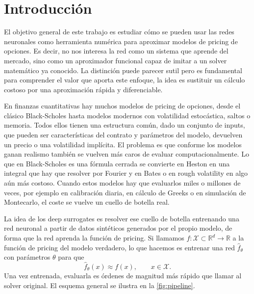 \documentclass[11pt,a4paper]{article}
\begin{document}
\section{Introducción}

El objetivo general de este trabajo es estudiar cómo se pueden usar las redes neuronales como herramienta numérica para aproximar modelos de pricing de opciones. Es decir, no nos interesa la red como un sistema que aprende del mercado, sino como un aproximador funcional capaz de imitar a un solver matemático ya conocido. La distinción puede parecer sutil pero es fundamental para comprender el valor que aporta este enfoque, la idea es sustituir un cálculo costoso por una aproximación rápida y diferenciable.

En finanzas cuantitativas hay muchos modelos de pricing de opciones, desde el clásico Black-Scholes hasta modelos modernos con volatilidad estocástica, saltos o memoria. Todos ellos tienen una estructura común, dado un conjunto de inputs, que pueden ser características del contrato y parámetros del modelo, devuelven un precio o una volatilidad implícita. El problema es que conforme los modelos ganan realismo también se vuelven más caros de evaluar computacionalmente. Lo que en Black-Scholes es una fórmula cerrada se convierte en Heston en una integral que hay que resolver por Fourier y en Bates o en rough volatility en algo aún más costoso. Cuando estos modelos hay que evaluarlos miles o millones de veces, por ejemplo en calibración diaria, en cálculo de Greeks o en simulación de Montecarlo, el coste se vuelve un cuello de botella real.

La idea de los deep surrogates es resolver ese cuello de botella entrenando una red neuronal a partir de datos sintéticos generados por el propio modelo, de forma que la red aprenda la función de pricing. Si llamamos $f : \mathcal{X} \subset \mathbb{R}^d \to \mathbb{R}$ a la función de pricing del modelo verdadero, lo que hacemos es entrenar una red $\hat{f}_\theta$ con parámetros $\theta$ para que
\begin{equation}
\hat{f}_\theta(x) \approx f(x), \qquad x \in \mathcal{X}.
\end{equation}
Una vez entrenada, evaluarla es órdenes de magnitud más rápido que llamar al solver original. El esquema general se ilustra en la \autoref{fig:pipeline}.
\end{document}
